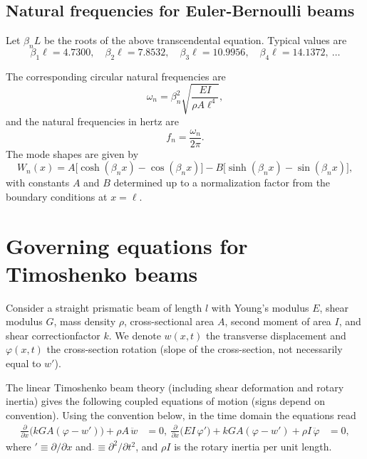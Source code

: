 \documentclass[11pt,a4paper]{article}
\begin{document}
\subsection{Natural frequencies for Euler-Bernoulli beams}
Let $\beta_n L$ be the roots of the above transcendental equation.
Typical values are
\[
      \beta_1\ell= 4.7300, \quad
      \beta_2\ell= 7.8532, \quad
      \beta_3\ell= 10.9956, \quad
      \beta_4\ell= 14.1372, \ \ldots
\]

The corresponding circular natural frequencies are
\[
      \omega_n = \beta_n^2 \sqrt{\frac{EI}{\rho A \ell^4}},
\]
and the natural frequencies in hertz are
\[
      f_n = \frac{\omega_n}{2\pi}.
\]
The mode shapes are given by
\[
      W_n(x) = A \big[\cosh(\beta_n x) - \cos(\beta_n x)\big]
      - B \big[\sinh(\beta_n x) - \sin(\beta_n x)\big],
\]
with constants $A$ and $B$ determined up to a normalization factor
from the boundary conditions at $x=\ell$.

\section{Governing equations for Timoshenko beams}

Consider a straight prismatic beam of length \(l\) with Young's modulus \(E\), shear modulus \(G\), mass density \(\rho\), cross-sectional area \(A\), second moment of area \(I\), and shear correctionfactor \(k\). We denote \(w(x,t)\) the transverse displacement and \(\varphi(x,t)\) the cross-section rotation (slope of the cross-section, not necessarily equal to \(w'\)).

The linear Timoshenko beam theory (including shear deformation and rotary inertia)
gives the following coupled equations of motion (signs depend on convention).
Using the convention below, in the time domain the equations read
$$
      \begin{aligned}
            \frac{\partial}{\partial x}\big( kGA(\varphi - w')\big) + \rho A\,\ddot w                    & = 0,\
            \frac{\partial}{\partial x}\big(EI\,\varphi'\big) + kGA(\varphi - w') + \rho I\,\ddot\varphi & = 0,
      \end{aligned}
$$
where \( '\equiv\partial/\partial x\) and \(\ddot{}\equiv\partial^2/\partial t^2\),
and \(\rho I\) is the rotary inertia per unit length.
\end{document}
